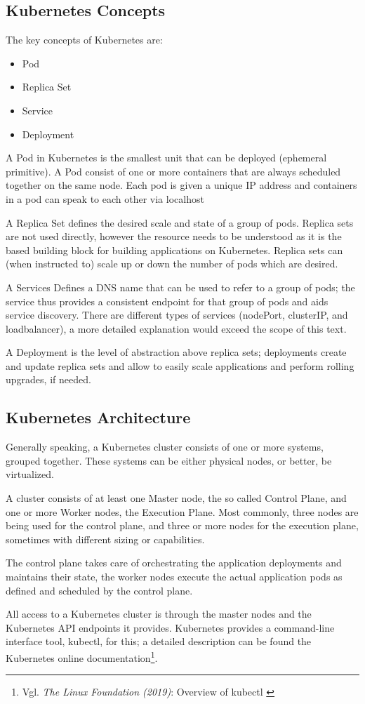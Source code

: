 \subsection{Kubernetes Concepts}

The key concepts of Kubernetes are:
\begin{itemize}
\item Pod
\item Replica Set
\item Service
\item Deployment
\end{itemize}

A Pod in Kubernetes is the smallest unit that can be deployed (ephemeral primitive). A Pod consist of one or more containers that are always scheduled together on the same node. Each pod is given a unique IP address and containers in a pod can speak to each other via localhost

A Replica Set defines the desired scale and state of a group of pods. Replica sets are not used directly, however the resource needs to be understood as it is the based building block for building applications on Kubernetes. Replica sets can (when instructed to) scale up or down the number of pods which are desired.

A Services Defines a DNS name that can be used to refer to a group of pods; the service thus provides a consistent endpoint for that group of pods and aids service discovery. There are different types of services (nodePort, clusterIP, and loadbalancer), a more detailed explanation would exceed the scope of this text.

A Deployment is the level of abstraction above replica sets; deployments create and update replica sets and allow to easily scale applications and perform rolling upgrades, if needed.

\subsection{Kubernetes Architecture}

Generally speaking, a Kubernetes cluster consists of one or more systems, grouped together. These systems can be either physical nodes, or better, be virtualized.

A cluster consists of at least one Master node, the so called Control Plane, and one or more Worker nodes, the Execution Plane. Most commonly, three nodes are being used for the control plane, and three or more nodes for the execution plane, sometimes with different sizing or capabilities.

The control plane takes care of orchestrating the application deployments and maintains their state, the worker nodes execute the actual application pods as defined and scheduled by the control plane.

All access to a Kubernetes cluster is through the master nodes and the Kubernetes API endpoints it provides. Kubernetes provides a command-line interface tool, kubectl, for this; a detailed description can be found the Kubernetes online documentation\footnote{Vgl. \textit{The Linux Foundation (2019)}: Overview of kubectl \cite{kubectl}}.
